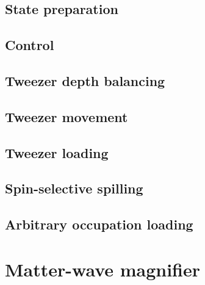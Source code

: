 \documentclass[twoside]{article}
\begin{document}
\subsection{State preparation} \label{subsec:state-prepation}

\subsection{Control} \label{subsec:control}


\subsection{Tweezer depth balancing} \label{subsec:balancing}


\newpage

\subsection{Tweezer movement} \label{subsec:tweezer-movement}


\newpage

\subsection{Tweezer loading} \label{subsec:tweezer-loading}


\newpage

\subsection{Spin-selective spilling} \label{subsec:spin-selective-spilling}


\subsection{Arbitrary occupation loading} \label{subsec:arbitrary-occupation-loading}



\newpage
\section{Matter-wave magnifier} \label{sec:mwm}
\end{document}
